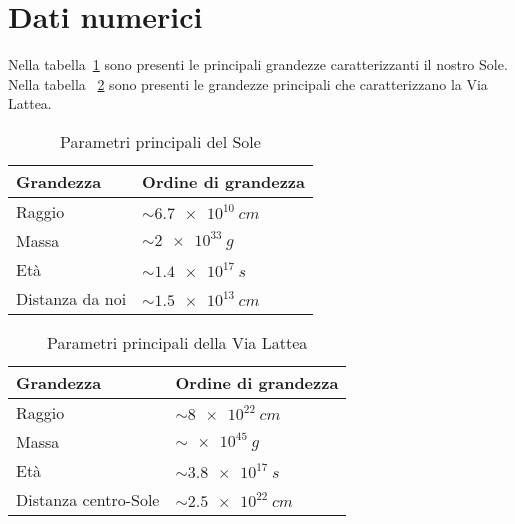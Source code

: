 \section{Dati numerici}\label{app:dati}
Nella tabella~\ref{apptab:sole} sono presenti le principali grandezze caratterizzanti il nostro Sole. Nella tabella ~\ref{apptab:vialattea} sono presenti le grandezze principali che caratterizzano la Via Lattea.

\begin{table}
\caption{Parametri principali del Sole}
\label{apptab:sole}
\centering
\begin{tabular}{ll}
\toprule
Grandezza & Ordine di grandezza \\
\midrule
Raggio          & $\sim \SI{6.7e10}{cm}$ \\
Massa           & $\sim \SI{2e33}{g}$    \\
Età             & $\sim \SI{1.4e17}{s}$  \\
Distanza da noi & $\sim \SI{1.5e13}{cm}$  \\
\bottomrule
\end{tabular}
\end{table}

\begin{table}
\caption{Parametri principali della Via Lattea}
\label{apptab:vialattea}
\centering
\begin{tabular}{ll}
\toprule
Grandezza & Ordine di grandezza \\
\midrule
Raggio               & $\sim \SI{8e22}{cm}$ \\
Massa                & $\sim \SI{e45}{g}$    \\
Età                  & $\sim \SI{3.8e17}{s}$  \\
Distanza centro-Sole & $\sim \SI{2.5e22}{cm}$  \\
\bottomrule
\end{tabular}
\end{table}